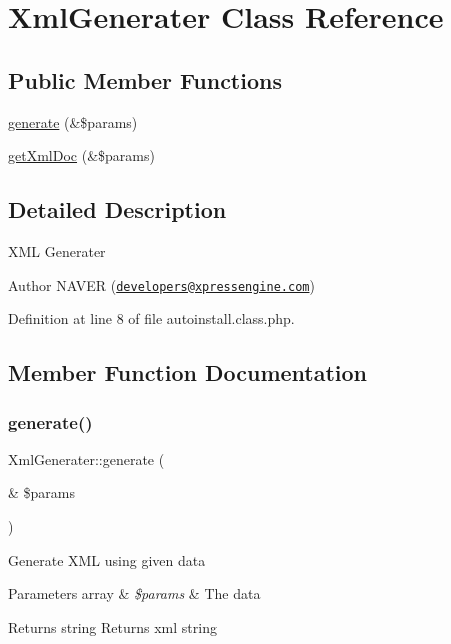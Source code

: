 \hypertarget{classXmlGenerater}{}\section{Xml\+Generater Class Reference}
\label{classXmlGenerater}
\subsection*{Public Member Functions}
\begin{DoxyCompactItemize}
\item 
\hyperlink{classXmlGenerater_a550936fddc7d2954e46b1e72846e4d89}{generate} (\&\$params)
\item 
\hyperlink{classXmlGenerater_a2c76cbd93596f5f7d48ff2ff0b9213ce}{get\+Xml\+Doc} (\&\$params)
\end{DoxyCompactItemize}


\subsection{Detailed Description}
X\+ML Generater \begin{DoxyAuthor}{Author}
N\+A\+V\+ER (\href{mailto:developers@xpressengine.com}{\tt developers@xpressengine.\+com}) 
\end{DoxyAuthor}


Definition at line 8 of file autoinstall.\+class.\+php.



\subsection{Member Function Documentation}
\hypertarget{classXmlGenerater_a550936fddc7d2954e46b1e72846e4d89}{}\label{classXmlGenerater_a550936fddc7d2954e46b1e72846e4d89} 
\subsubsection{\texorpdfstring{generate()}{generate()}}
{\footnotesize\ttfamily Xml\+Generater\+::generate (\begin{DoxyParamCaption}\item[{\&}]{\$params }\end{DoxyParamCaption})}

Generate X\+ML using given data


\begin{DoxyParams}[1]{Parameters}
array & {\em \$params} & The data \\
\hline
\end{DoxyParams}
\begin{DoxyReturn}{Returns}
string Returns xml string 
\end{DoxyReturn}


